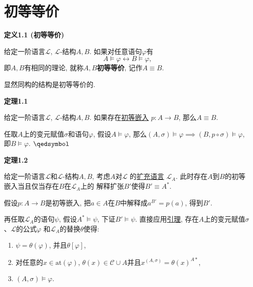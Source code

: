


\setlength{\abovedisplayskip}{1pt}
\setlength{\belowdisplayskip}{1pt}

\section{初等等价}

\hypertarget{sec:定义1.1}{}
\noindent\textbf{定义1.1 (初等等价)}

给定一阶语言$\mathcal{L}$, $\mathcal{L}$-结构$A,B$. 如果对任意语句$\varphi$有
\[
    A\models\varphi\leftrightarrow B\models\varphi,
\]
即$A,B$有相同的理论, 就称$A,B$\textbf{初等等价}, 记作$A\equiv B$.

\vspace{10pt}

显然同构的结构是初等等价的.

\vspace{10pt}

\hypertarget{sec:定理1.1}{}
\noindent\textbf{定理1.1}

给定一阶语言$\mathcal{L}$, $\mathcal{L}$-结构$A,B$.
如果存在\href{01 初等嵌入#nameddest=sec:定义1.1}{初等嵌入} $p:A\to B$,
那么$A\equiv B$.


任取$A$上的变元赋值$\sigma$和语句$\varphi$, 假设$A\models\varphi$,
那么$(A,\sigma)\models\varphi\implies(B,p\circ\sigma)\models\varphi$,
即$B\models\varphi$. \hfill $\qedsymbol$

\vspace{10pt}

\hypertarget{sec:定理1.2}{}
\noindent\textbf{定理1.2}

给定一阶语言$\mathcal{L}$和$\mathcal{L}$-结构$A,B$, 考虑$A$对$\mathcal{L}$
的\href{../02 一阶语义/02 语言的限制与扩张#nameddest=sec:定义2.1}{扩充语言}
$\mathcal{L}_A$. 此时存在$A$到$B$的初等嵌入当且仅当存在$B$在$\mathcal{L}_A$上的
解释扩张$B'$使得$B'\equiv A^*$.



假设$p:A\to B$是初等嵌入, 把$a\in A$在$B$中解释成$a^{B'}=p(a)$, 得到$B'$.

再任取$\mathcal{L}_A$的语句$\psi$, 假设$A^*\models\psi$, 下证$B'\models\psi$.
直接应用\href{../02 一阶语义/04 替换定理#nameddest=sec:定理2.2}{引理},
存在$A$上的变元赋值$\sigma$、$\mathcal{L}$的公式$\varphi$
和$\mathcal{L}_A$的替换$\theta$使得:
\begin{enumerate}
    \item $\psi=\theta(\varphi)$, 并且$\theta[\varphi]$,
    \item 对任意的$x\in\mathrm{at}(\varphi)$,
    $\theta(x)\in\mathcal{C}\cup A$并且$x^{(A,\sigma)}=\theta(x)^{A*}$,
    \item $(A,\sigma)\models\varphi$.
\end{enumerate}

